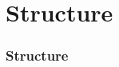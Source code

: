 \section*{Structure}
\begin{frame}
  \frametitle{Structure}
  \tableofcontents[hideallsubsections]
\end{frame}
